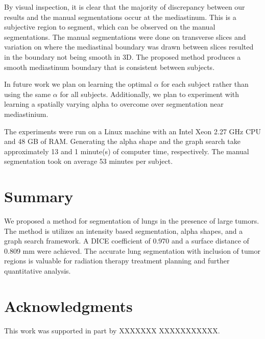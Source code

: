 \documentclass{llncs}
\begin{document}
By visual inspection, it is clear that the majority of discrepancy between our results and the manual segmentations occur at the mediastinum. This is a subjective region to segment, which can be observed on the manual segmentations. The manual segmentations were done on transverse slices and variation on where the mediastinal boundary was drawn between slices resulted in the boundary not being smooth in 3D. The proposed method produces a smooth mediastinum boundary that is consistent between subjects. 

In future work we plan on learning the optimal $\alpha$ for each subject rather than using the same $\alpha$ for all subjects. Additionally, we plan to experiment with learning a spatially varying alpha to overcome over segmentation near mediastinium.

The experiments were run on a Linux machine with an Intel Xeon 2.27 GHz CPU and 48 GB of RAM. Generating the alpha shape and the graph search take approximately 13 and 1 minute(s) of computer time, respectively. The manual segmentation took on average 53 minutes per subject.
%
\section{Summary}
%
We proposed a method for segmentation of lungs in the presence of large tumors. The method is utilizes an intensity based segmentation, alpha shapes, and a graph search framework. A DICE coefficient of 0.970 and a surface distance of 0.809 mm were achieved. The accurate lung segmentation with  inclusion of tumor regions is valuable for radiation therapy treatment planning and further quantitative analysis.
%
\section{Acknowledgments}
%
This work was supported in part by 
XXXXXXX XXXXXXXXXXX.


%
%









\clearpage
{} %
\renewcommand{\indexname}{Author Index}
\printindex
\clearpage

\end{document}
